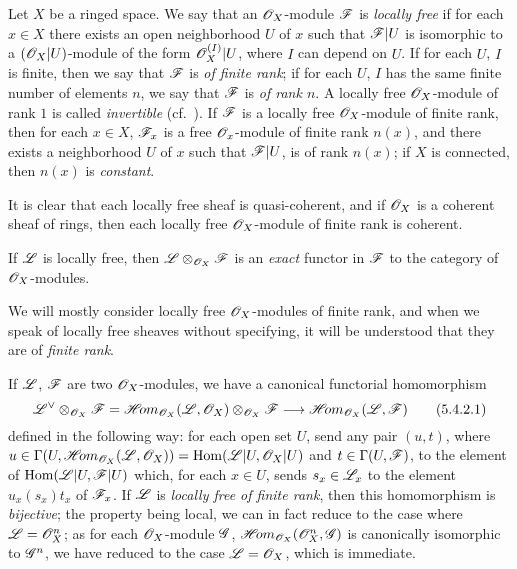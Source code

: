 \begin{env}[5.4.1]
\label{0.5.4.1}
Let $X$ be a ringed space.
We say that an $\mathscr{O}_X$-module $\mathscr{F}$ is \emph{locally free} if for each $x\in X$ there exists an open neighborhood $U$ of $x$ such that $\mathscr{F}|U$ is isomorphic to a $(\mathscr{O}_X|U)$-module of the form $\mathscr{O}_X^{(I)}|U$, where $I$ can depend on $U$.
If for each $U$, $I$ is finite, then we say that $\mathscr{F}$ is \emph{of finite rank};
if for each $U$, $I$ has the same finite number of elements $n$, we say that $\mathscr{F}$ is \emph{of rank $n$}.
A locally free $\mathscr{O}_X$-module of rank $1$ is called \emph{invertible} (cf.~).
If $\mathscr{F}$ is a locally free $\mathscr{O}_X$-module of finite rank, then for each $x\in X$, $\mathscr{F}_x$ is a free $\mathscr{O}_x$-module of finite rank $n(x)$, and there exists a neighborhood $U$ of $x$ such that $\mathscr{F}|U$, is of rank $n(x)$;
if $X$ is connected, then $n(x)$ is \emph{constant}.

It is clear that each locally free sheaf is quasi-coherent, and if $\mathscr{O}_X$ is a coherent sheaf of rings, then each locally free $\mathscr{O}_X$-module of finite rank is coherent.

If $\mathscr{L}$ is locally free, then $\mathscr{L}\otimes_{\mathscr{O}_X}\mathscr{F}$ is an \emph{exact} functor in $\mathscr{F}$ to the category of $\mathscr{O}_X$-modules.

We will mostly consider locally free $\mathscr{O}_X$-modules of finite rank,
and when we speak of locally free sheaves without specifying, it will be understood that they are of \emph{finite rank}.

\end{env}

\begin{env}[5.4.2]
\label{0.5.4.2}
If $\mathscr{L}$, $\mathscr{F}$ are two $\mathscr{O}_X$-modules, we have a canonical functorial homomorphism
\[
  \dual{\sh{L}}\otimes_{\sh{O}_X}\sh{F}=\shHom_{\sh{O}_X}(\sh{L},\sh{O}_X)\otimes_{\sh{O}_X}\sh{F}\to\shHom_{\sh{O}_X}(\sh{L},\sh{F})
  \tag{5.4.2.1}
\]
defined in the following way:
for each open set $U$, send any pair $(u,t)$, where $u\in\Gamma(U,\mathscr{H}\!{om}_{\mathscr{O}_X}(\mathscr{L},\mathscr{O}_X))={\mathop{\mathrm{Hom}}\nolimits}(\mathscr{L}|U,\mathscr{O}_X|U)$ and $t\in\Gamma(U,\mathscr{F})$, to the element of ${\mathop{\mathrm{Hom}}\nolimits}(\mathscr{L}|U,\mathscr{F}|U)$ which, for each $x\in U$, sends $s_x\in\mathscr{L}_x$ to the element $u_x(s_x)t_x$ of $\mathscr{F}_x$.
If $\mathscr{L}$ is \emph{locally free of finite rank}, then this homomorphism is \emph{bijective};
the property being local, we can in fact reduce to the case where $\mathscr{L}=\mathscr{O}_X^n$;
as for each $\mathscr{O}_X$-module $\mathscr{G}$, $\mathscr{H}\!{om}_{\mathscr{O}_X}(\mathscr{O}_X^n,\mathscr{G})$ is canonically isomorphic to $\mathscr{G}^n$, we have reduced to the case $\mathscr{L}=\mathscr{O}_X$, which is immediate.
\end{env}

